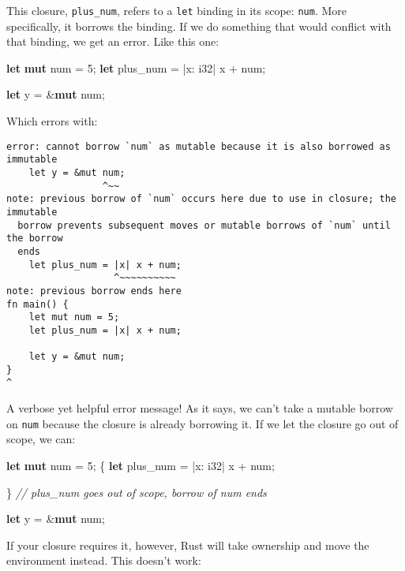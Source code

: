 \documentclass[a4paper,]{book}
\newenvironment{Shaded}{\begin{snugshade}}{\end{snugshade}}
\newcommand{\KeywordTok}[1]{\textcolor[rgb]{0.13,0.29,0.53}{\textbf{{#1}}}}
\newcommand{\DataTypeTok}[1]{\textcolor[rgb]{0.13,0.29,0.53}{{#1}}}
\newcommand{\DecValTok}[1]{\textcolor[rgb]{0.00,0.00,0.81}{{#1}}}
\newcommand{\CommentTok}[1]{\textcolor[rgb]{0.56,0.35,0.01}{\textit{{#1}}}}
\newcommand{\NormalTok}[1]{{#1}}
\begin{document}
This closure, \texttt{plus\_num}, refers to a \texttt{let} binding in
its scope: \texttt{num}. More specifically, it borrows the binding. If
we do something that would conflict with that binding, we get an error.
Like this one:

\begin{Shaded}
\begin{Highlighting}[]
\KeywordTok{let} \KeywordTok{mut} \NormalTok{num = }\DecValTok{5}\NormalTok{;}
\KeywordTok{let} \NormalTok{plus_num = |x: }\DataTypeTok{i32}\NormalTok{| x + num;}

\KeywordTok{let} \NormalTok{y = &}\KeywordTok{mut} \NormalTok{num;}
\end{Highlighting}
\end{Shaded}

Which errors with:

\begin{verbatim}
error: cannot borrow `num` as mutable because it is also borrowed as immutable
    let y = &mut num;
                 ^~~
note: previous borrow of `num` occurs here due to use in closure; the immutable
  borrow prevents subsequent moves or mutable borrows of `num` until the borrow
  ends
    let plus_num = |x| x + num;
                   ^~~~~~~~~~~
note: previous borrow ends here
fn main() {
    let mut num = 5;
    let plus_num = |x| x + num;

    let y = &mut num;
}
^
\end{verbatim}

A verbose yet helpful error message! As it says, we can't take a mutable
borrow on \texttt{num} because the closure is already borrowing it. If
we let the closure go out of scope, we can:

\begin{Shaded}
\begin{Highlighting}[]
\KeywordTok{let} \KeywordTok{mut} \NormalTok{num = }\DecValTok{5}\NormalTok{;}
\NormalTok{\{}
    \KeywordTok{let} \NormalTok{plus_num = |x: }\DataTypeTok{i32}\NormalTok{| x + num;}

\NormalTok{\} }\CommentTok{// plus_num goes out of scope, borrow of num ends}

\KeywordTok{let} \NormalTok{y = &}\KeywordTok{mut} \NormalTok{num;}
\end{Highlighting}
\end{Shaded}

If your closure requires it, however, Rust will take ownership and move
the environment instead. This doesn't work:
\end{document}

